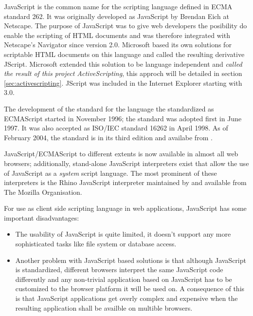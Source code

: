 JavaScript is the common name for the scripting language defined in ECMA standard 262. It was originally developed as JavaScript by Brendan Eich at Netscape. The purpose of JavaScript was to give web developers the posibility do enable the scripting of HTML documents and was therefore integrated with Netscape's Navigator since version 2.0. Microsoft based its own solutions for scriptable HTML documents on this language and called the resulting derivative JScript. Microsoft extended this solution to be language independent and \emph{called the result of this project ActiveScripting}, this approch will be detailed in section \ref{sec:activescripting}. JScript was included in the Internet Explorer starting with 3.0.

The development of the standard for the language the standardized as ECMAScript started in November 1996; the standard was adopted first in June 1997. It was also accepted as ISO/IEC standard 16262 in April 1998. As of February 2004, the standard is in its third edition and availabe from \cite{ECMA-262}.


JavaScript/ECMAScript to different extents is now available in almost all web browsers; additionally, stand-alone JavaScript interpreters exist that allow the use of JavaScript as a \emph{system} script language. The most prominent of these interpreters is the Rhino JavaScript interpreter maintained by and available from The Mozilla Organisation.


For use as client side scripting language in web applications, JavaScript has some important disadvantages:

\begin{itemize}
	\item The usability of JavaScript is quite limited, it doesn't support any more sophisticated tasks like file system or database access. 
	\item Another problem with Java\-Script based solutions is that although Java\-Script is standardized, different browsers interpret the same JavaScript code differently and any non-trivial application based on JavaScript has to be customized to the browser platform it will be used on. A consequence of this is that JavaScript applications get overly complex and expensive when the resulting application shall be availble on multible browsers.
	
\end{itemize}

